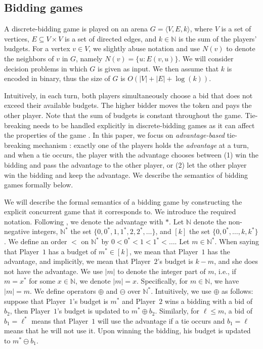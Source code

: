\documentclass{theoretics}
\newcommand{\PO}{Player~$1$\xspace}
\newcommand{\PT}{Player~$2$\xspace}
\newcommand{\Nat}{\mathbb{N}}
\newcommand{\zug}[1]{\langle #1  \rangle}
\renewcommand{\set}[1]{\{ #1  \}}
\begin{document}
\subsection{Bidding games}
A discrete-bidding game is played on an arena $G = \zug{V, E, k}$, where $V$ is a set of vertices, $E \subseteq V \times V$ is a set of directed edges, and $k \in \Nat$ is the sum of the players' budgets. For a vertex $v \in V$, we slightly abuse notation and use $N(v)$ to denote the neighbors of $v$ in $G$, namely $N(v) = \set{u: E(v,u)}$. We will consider decision problems in which $G$ is given as input. We then assume that $k$ is encoded in binary, thus the size of $G$ is $O(|V| + |E| + \log(k))$.

Intuitively, in each turn, both players simultaneously choose a bid that does not exceed their available budgets. The higher bidder moves the token and pays the other player. Note that the sum of budgets is constant throughout the game. 
Tie-breaking needs to be handled explicitly in discrete-bidding games as it can affect the properties of the game \cite{AAH21}. In this paper, we focus on {\em advantage-based} tie-breaking mechanism \cite{DP10}: exactly one of the players holds the {\em advantage} at a turn, and when a tie occurs, the player with the advantage chooses between (1) win the bidding and pass the advantage to the other player, or (2) let the other player win the bidding and keep the advantage.
We describe the semantics of bidding games formally below.

We will describe the formal semantics of a bidding game by constructing the explicit concurrent game that it corresponds to. We introduce the required notation. Following \cite{DP10}, we denote the advantage with $*$. Let $\Nat$ denote the non-negative integers, $\Nat^*$ the set $\set{0, 0^*, 1, 1^*, 2, 2^*, \ldots}$, and $[k]$ the set $\set{0,0^*,\ldots, k, k^*}$. We define an order $<$ on $\Nat^*$ by $0 < 0^* < 1 < 1^* < \ldots$. Let $m \in \Nat^*$. When saying that \PO has a budget of $m^* \in [k]$, we mean that \PO has the advantage, and implicitly, we mean that \PT's budget is $k-m$, and she does not have the advantage. 
We use $|m|$ to denote the integer part of $m$, i.e., if \(m = x^*\) for some \(x \in \Nat\), we denote \(|m| = x\).
Specifically, for \(m \in \Nat\), we have \(|m| = m\).  
We define operators $\oplus$ and $\ominus$ over $\Nat^*$.
Intuitively, we use \(\oplus\) as follows: suppose that \PO's budget is $m^*$ and \PT wins a bidding with a bid of $b_2$, then \PO's budget is updated to $m^* \oplus b_2$. Similarly, for $\ell \leq m$, a bid of $b_1 = \ell^*$ means that \PO will use the advantage if a tie occurs and $b_1 = \ell$ means that he will not use it. Upon winning the bidding, his budget is updated to $m^* \ominus b_1$. 
\end{document}
